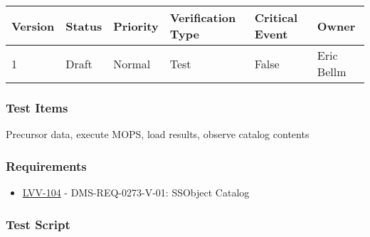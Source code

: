 \begin{longtable}[]{@{}llllll@{}}
\toprule
Version & Status & Priority & Verification Type & Critical Event &
Owner\tabularnewline
\midrule
\endhead
1 & Draft & Normal & Test & False & Eric Bellm\tabularnewline
\bottomrule
\end{longtable}

\hypertarget{test-items-142}{%
\subsubsection{Test Items}\label{test-items-142}}

Precursor data, execute MOPS, load results, observe catalog contents

\hypertarget{requirements-143}{%
\subsubsection{Requirements}\label{requirements-143}}

\begin{itemize}
\tightlist
\item
  \href{https://jira.lsstcorp.org/browse/LVV-104}{LVV-104} -
  DMS-REQ-0273-V-01: SSObject Catalog
\end{itemize}

\hypertarget{test-script-143}{%
\subsubsection{Test Script}\label{test-script-143}}

